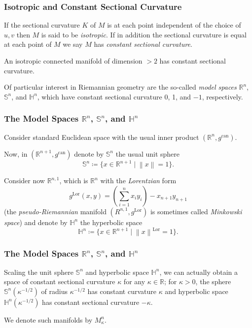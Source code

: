 \documentclass{beamer}
\DeclareMathOperator{\can}{can}
\DeclareMathOperator{\Lor}{Lor}
\newcommand{\Sp}{\mathbb{S}}
\newcommand{\Hy}{\mathbb{H}}
\newcommand{\R}{\mathbb{R}}
\newcommand{\norm}[1]{\left\lVert#1\right\rVert}
\theoremstyle{definition}
\begin{document}
\begin{frame}
    \frametitle{Isotropic and Constant Sectional Curvature}

    \begin{definition}
        If the sectional curvature $K$ of $M$ is at each point independent of the
        choice of $u,v$ then $M$ is said to be \emph{isotropic}. If in addition
        the sectional curvature is equal at each point of $M$ we say $M$ has
        \emph{constant sectional curvature}.
    \end{definition}

    \begin{lemma}
        An isotropic connected manifold of dimension $> 2$ has constant sectional curvature.
    \end{lemma}

    Of particular interest in Riemannian geometry are the so-called
    \emph{model spaces} $\R^n$, $\Sp^n$, and $\Hy^n$, which have constant
    sectional curvature 0, 1, and $-1$, respectively.

\end{frame}

\begin{frame}
    \frametitle{The Model Spaces $\R^n$, $\Sp^n$, and $\Hy^n$}

    Consider standard Euclidean space with the usual inner product $(\R^n, g^{\can})$.

    Now, in $(\R^{n+1}, g^{\can})$ denote by $\Sp^n$ the usual unit sphere
    \[
      \Sp^n \coloneqq \{x \in \R^{n+1} \mid \norm{x} = 1\}.
    \]

    Consider now $\R^{n,1}$, which is $\R^n$ with the \emph{Lorentzian} form
    \[
        g^{\Lor}(x,y) = \left(\sum_{i=1}^n x_i y_i\right) - x_{n+1}y_{n+1}
    \]
    (the \emph{pseudo-Riemannian} manifold $(R^{n,1},g^{\Lor})$ is sometimes
    called \emph{Minkowski space})
    and denote by $\Hy^n$ the hyperbolic space
    \[
      \Hy^n \coloneqq \{x \in \R^{n+1} \mid \norm{x}^{\Lor} = 1\}.
    \]
\end{frame}

\begin{frame}
    \frametitle{The Model Spaces $\R^n$, $\Sp^n$, and $\Hy^n$}

    Scaling the unit sphere $\Sp^n$ and hyperbolic space $\Hy^n$, we can
    actually obtain a space of constant sectional curvature $\kappa$ for any
    $\kappa \in \R$; for $\kappa > 0$, the sphere $\Sp^n(\kappa^{-1/2})$ of radius
    $\kappa^{-1/2}$ has constant curvature $\kappa$ and hyperbolic space
    $\Hy^n(\kappa^{-1/2})$ has constant sectional curvature $-\kappa$.

    We denote such manifolds by $M_\kappa^n$.

\end{frame}
\end{document}
